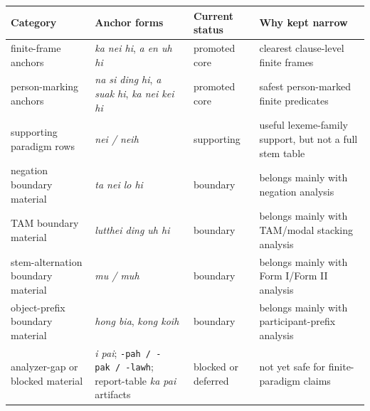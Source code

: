\documentclass[
  11pt,
  a4paper,
]{article}
\newcounter{none} %
\newcommand{\tdim}[1]{\textit{#1}}
\begin{document}
{\def\LTcaptype{none} %
\begin{longtable}[]{@{}
  >{\raggedright\arraybackslash}p{}
  >{\raggedright\arraybackslash}p{}
  >{\raggedright\arraybackslash}p{}
  >{\raggedright\arraybackslash}p{}@{}}
\toprule\noalign{}
\begin{minipage}[b]{\linewidth}\raggedright
Category
\end{minipage} & \begin{minipage}[b]{\linewidth}\raggedright
Anchor forms
\end{minipage} & \begin{minipage}[b]{\linewidth}\raggedright
Current status
\end{minipage} & \begin{minipage}[b]{\linewidth}\raggedright
Why kept narrow
\end{minipage} \\
\midrule\noalign{}
\endhead
\bottomrule\noalign{}
\endlastfoot
finite-frame anchors & \tdim{ka nei hi}, \tdim{a en uh hi} & promoted
core & clearest clause-level finite frames \\
person-marking anchors & \tdim{na si ding hi}, \tdim{a suak hi},
\tdim{ka nei kei hi} & promoted core & safest person-marked finite
predicates \\
supporting paradigm rows & \tdim{nei / neih} & supporting & useful
lexeme-family support, but not a full stem table \\
negation boundary material & \tdim{ta nei lo hi} & boundary & belongs
mainly with negation analysis \\
TAM boundary material & \tdim{lutthei ding uh hi} & boundary & belongs
mainly with TAM/modal stacking analysis \\
stem-alternation boundary material & \tdim{mu / muh} & boundary &
belongs mainly with Form I/Form II analysis \\
object-prefix boundary material & \tdim{hong bia}, \tdim{kong koih} &
boundary & belongs mainly with participant-prefix analysis \\
analyzer-gap or blocked material & \tdim{i pai};
\texttt{-pah\ /\ -pak\ /\ -lawh}; report-table \tdim{ka pai} artifacts &
blocked or deferred & not yet safe for finite-paradigm claims \\
\end{longtable}
}
\end{document}
